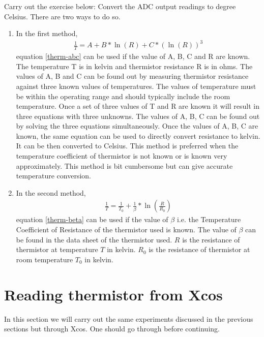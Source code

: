 \begin{exercise}
  Carry out the exercise below: Convert the ADC output readings to
  degree Celsius. There are two ways to do so.
\begin{enumerate}
\item  In the first method,
\begin{align}
\frac{1}{T}=A+B*\ln(R)+C*(\ln(R))^3
\label{therm-abc}
\end{align}
equation \ref{therm-abc} can be used if the value of A, B, C and R are
known. The temperature T is in kelvin and thermistor resistance R is
in ohms. The values of A, B and C can be found out by measuring
thermistor resistance against three known values of temperatures. The
values of temperature must be within the operating range and should
typically include the room temperature. Once a set of three values of
T and R are known it will result in three equations with three
unknowns. The values of A, B, C can be found out by solving the three
equations simultaneously. Once the values of A, B, C are known, the
same equation can be used to directly convert resistance to kelvin. It
can be then converted to Celsius. This method is preferred when the
temperature coefficient of thermistor is not known or is known very
approximately. This method is bit cumbersome but can give accurate
temperature conversion.

\item In the second method,
\begin{align}
\frac{1}{T}=\frac{1}{T_0}+\frac{1}{\beta}*\ln\left(\frac{R}{R_0}\right)
\label{therm-beta}
\end{align}
equation \ref{therm-beta} can be used if the value of $\beta$ i.e. the
Temperature Coefficient of Resistance of the thermistor used is
known. The value of $\beta$ can be found in the data sheet of the
thermistor used. $R$ is the resistance of thermistor at temperature
$T$ in kelvin.  $R_0$ is the resistance of thermistor at room
temperature $T_0$ in kelvin.
\end{enumerate}
\end{exercise}

\section{Reading thermistor from Xcos}
In this section we will carry out the same experiments discussed in
the previous sections but through Xcos. One should go through
 before continuing.


